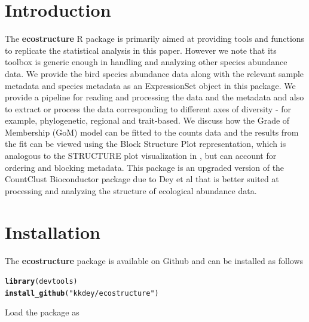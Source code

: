 \documentclass[12pt]{article}\usepackage[]{graphicx}\usepackage[usenames,dvipsnames]{color}
\makeatletter
\newcommand{\hlstr}[1]{\textcolor[rgb]{0.192,0.494,0.8}{#1}}%
\newcommand{\hlstd}[1]{\textcolor[rgb]{0.345,0.345,0.345}{#1}}%
\newcommand{\hlkwd}[1]{\textcolor[rgb]{0.737,0.353,0.396}{\textbf{#1}}}%
\newenvironment{kframe}{%
 \def\at@end@of@kframe{}%
 \ifinner\ifhmode%
  \def\at@end@of@kframe{\end{minipage}}%
  \begin{minipage}{\columnwidth}%
 \fi\fi%
 \def\FrameCommand##1{\hskip\@totalleftmargin \hskip-\fboxsep
 \colorbox{shadecolor}{##1}\hskip-\fboxsep
     \hskip-\linewidth \hskip-\@totalleftmargin \hskip\columnwidth}%
 \MakeFramed {\advance\hsize-\width
   \@totalleftmargin\z@ \linewidth\hsize
   \@setminipage}}%
 {\par\unskip\endMakeFramed%
 \at@end@of@kframe}
\newenvironment{knitrout}{}{} %
\makeatother
\begin{document}
\maketitle

\section{Introduction}

The \textbf{ecostructure} R package is primarily aimed at providing tools and functions to replicate the statistical analysis in this paper. However we note that its toolbox is generic enough in handling and analyzing other species abundance data. We provide the bird species abundance data along with the relevant sample metadata and species metadata as an ExpressionSet object in this package. We provide a pipeline for reading and processing the data and the metadata and also to extract or process the data corresponding to different axes of diversity - for example, phylogenetic, regional and trait-based. We discuss how the Grade of Membership (GoM) model can be fitted to the counts data and the results from the fit can be viewed using the Block Structure Plot representation, which is analogous to the STRUCTURE plot visualization in \cite{Rosenberg2002} \cite{Pritchard2000}, but can account for ordering and blocking metadata. This package is an upgraded version of the CountClust Bioconductor package due to Dey et al \cite{Dey2016} that is better suited at processing and analyzing the structure of ecological abundance data.

\section{Installation}

The \textbf{ecostructure} package is available on Github and can be installed as follows



\begin{knitrout}
\color{fgcolor}\begin{kframe}
\begin{alltt}
\hlkwd{library}\hlstd{(devtools)}
\hlkwd{install_github}\hlstd{(}\hlstr{"kkdey/ecostructure"}\hlstd{)}
\end{alltt}
\end{kframe}
\end{knitrout}

Load the package as
\end{document}
